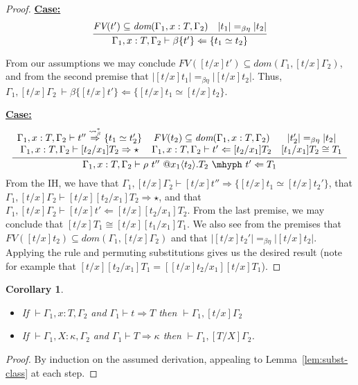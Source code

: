 \documentclass{article}
\newcommand{\tpcheck}[0]{\Leftarrow}
\newcommand{\tpsynth}[0]{\Rightarrow}
\newcommand{\tpsynthleads}[0]{\ensuremath{\overset{\leadsto_\beta^*}{\Rightarrow}}}
\newcommand{\startcase}[1]{\vspace{#1} \noindent\textbf{\underline{Case:}}}
\newtheorem{corollary}[theorem]{Corollary}
\begin{document}
\begin{proof}
  \startcase{.2cm}
  \[
    \infer{\Gamma_1,x:T,\Gamma_2\vdash \beta\{t'\} \tpcheck \{ t_1 \simeq t_2 \}}
    {\textit{FV}(t')\subseteq \textit{dom}(\Gamma_1,x:T,\Gamma_2) \quad |t_1| =_{\beta\eta} |t_2|}
  \]

  From our assumptions we may conclude \(\textit{FV}([t/x]t') \subseteq
  \textit{dom}(\Gamma_1,[t/x]\Gamma_2)\), and from the second premise that
  \(|[t/x]t_1| =_{\beta\eta} |[t/x]t_2|\).
  Thus, \(\Gamma_1,[t/x]\Gamma_2\ \vdash \beta\{[t/x]t'\}\tpcheck \{[t/x]t_1
  \simeq [t/x]t_2\}\).

  \startcase{.2cm}
  \[
    \infer{\Gamma_1,x:T,\Gamma_2 \vdash \rho\ t''\ @x_1\langle t_2 \rangle.T_2\ \mhyph\ t' \tpcheck T_1}
    {
      \begin{array}{ccc}
        \Gamma_1,x:T,\Gamma_2 \vdash t'' \tpsynthleads \{t_1 \simeq t_2'\}
        & \textit{FV}(t_2) \subseteq \textit{dom}(\Gamma_1,x:T,\Gamma_2)
        & |t_2'| =_{\beta\eta} |t_2|
        \\ \Gamma_1,x:T,\Gamma_2 \vdash [t_2/x_1] T_2 \tpsynth \star
        & \Gamma_1,x:T,\Gamma_2 \vdash t' \tpcheck [t_2/x_1]T_2
        & [t_1/x_1]T_2 \cong T_1
      \end{array}
    }
  \]
  From the IH, we have that \(\Gamma_1,[t/x]\Gamma_2 \vdash [t/x]t'' \tpsynth \{[t/x]t_1
  \simeq [t/x]t_2'\}\), that \(\Gamma_1,[t/x]\Gamma_2 \vdash [t/x][t_2/x_1]T_2
  \tpsynth \star\), and that \(\Gamma_1,[t/x]\Gamma_2 \vdash [t/x]t' \tpcheck
  [t/x][t_2/x_1]T_2\).
  From the last premise, we may conclude that \([t/x]T_1 \cong
  [t/x][t_1/x_1]T_1\).
  We also see from the premises that \(\textit{FV}([t/x]t_2) \subseteq
  \textit{dom}(\Gamma_1,[t/x]\Gamma_2)\) and that \(|[t/x]t_2'| =_{\beta\eta}
  |[t/x]t_2|\).
  Applying the rule and permuting substitutions gives us the desired result
  (note for example that \([t/x][t_2/x_1]T_1 = [[t/x]t_2/x_1][t/x]T_1\)).
\end{proof}

\begin{corollary}
  \ \\
  \begin{itemize}
  \item If \(\vdash \Gamma_1,x:T,\Gamma_2\) and \(\Gamma_1 \vdash t \tpsynth T\)
    then \(\vdash \Gamma_1,[t/x]\Gamma_2\)
    
  \item If \(\vdash \Gamma_1,X:\kappa,\Gamma_2\) and \(\Gamma_1 \vdash T
    \tpsynth \kappa\) then \(\vdash \Gamma_1,[T/X]\Gamma_2\).
  \end{itemize}
\end{corollary}
\begin{proof}
  By induction on the assumed derivation, appealing to
  Lemma~\ref{lem:subst-class} at each step.
\end{proof}
\end{document}
